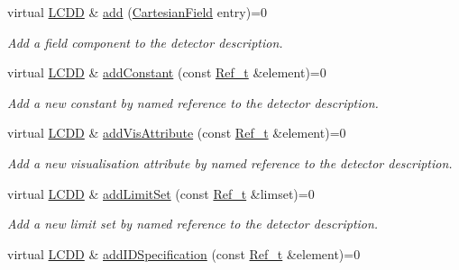 \begin{DoxyCompactItemize}
virtual \hyperlink{class_d_d4hep_1_1_geometry_1_1_l_c_d_d}{LCDD} \& \hyperlink{class_d_d4hep_1_1_geometry_1_1_l_c_d_d_a57833b868c0abeb0d1ee43d1895a5996}{add} (\hyperlink{class_d_d4hep_1_1_geometry_1_1_cartesian_field}{CartesianField} entry)=0
\begin{DoxyCompactList}\small\item\em Add a field component to the detector description. \item\end{DoxyCompactList}\item 
virtual \hyperlink{class_d_d4hep_1_1_geometry_1_1_l_c_d_d}{LCDD} \& \hyperlink{class_d_d4hep_1_1_geometry_1_1_l_c_d_d_ac2bc82eba942bd452da56bbf958d8aad}{addConstant} (const \hyperlink{group___d_d4_h_e_p___g_e_o_m_e_t_r_y_ga40af83be6718bb8828a3d83dc7f8c930}{Ref\_\-t} \&element)=0
\begin{DoxyCompactList}\small\item\em Add a new constant by named reference to the detector description. \item\end{DoxyCompactList}\item 
virtual \hyperlink{class_d_d4hep_1_1_geometry_1_1_l_c_d_d}{LCDD} \& \hyperlink{class_d_d4hep_1_1_geometry_1_1_l_c_d_d_a705cc171273fe3aa63100385b1bd7191}{addVisAttribute} (const \hyperlink{group___d_d4_h_e_p___g_e_o_m_e_t_r_y_ga40af83be6718bb8828a3d83dc7f8c930}{Ref\_\-t} \&element)=0
\begin{DoxyCompactList}\small\item\em Add a new visualisation attribute by named reference to the detector description. \item\end{DoxyCompactList}\item 
virtual \hyperlink{class_d_d4hep_1_1_geometry_1_1_l_c_d_d}{LCDD} \& \hyperlink{class_d_d4hep_1_1_geometry_1_1_l_c_d_d_af11d7a6aaeb91256f14d5892d84e2b30}{addLimitSet} (const \hyperlink{group___d_d4_h_e_p___g_e_o_m_e_t_r_y_ga40af83be6718bb8828a3d83dc7f8c930}{Ref\_\-t} \&limset)=0
\begin{DoxyCompactList}\small\item\em Add a new limit set by named reference to the detector description. \item\end{DoxyCompactList}\item 
virtual \hyperlink{class_d_d4hep_1_1_geometry_1_1_l_c_d_d}{LCDD} \& \hyperlink{class_d_d4hep_1_1_geometry_1_1_l_c_d_d_a93f80b4976e72a8a64d73baa6cf50a4d}{addIDSpecification} (const \hyperlink{group___d_d4_h_e_p___g_e_o_m_e_t_r_y_ga40af83be6718bb8828a3d83dc7f8c930}{Ref\_\-t} \&element)=0

\end{DoxyCompactItemize}
